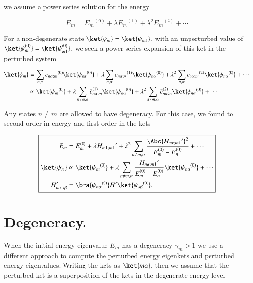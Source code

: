 we assume a power series solution for the energy

\begin{equation}\label{eqn:qmTwoReview:350}
E_m = {E_m}^{(0)} + \lambda {E_m}^{(1)} + \lambda^2 {E_m}^{(2)} + \cdots
\end{equation}

For a non-degenerate state $\ket{\psi_m} = \ket{\psi_{m1}}$, with an unperturbed value of $\ket{\psi_{m}^{(0)}} = \ket{\psi_{m1}^{(0)}}$, we seek a power series expansion of this ket in the perturbed system

\begin{equation}\label{eqn:qmTwoL4:130}
\begin{aligned}
\ket{\psi_m} &= 
\sum_{n,\alpha} {c_{n\alpha;m}}^{(0)} \ket{{\psi_{n\alpha}}^{(0)}} 
+
\lambda
\sum_{n,\alpha} {c_{n\alpha;m}}^{(1)} \ket{{\psi_{n\alpha}}^{(0)}} 
+ 
\lambda^2
\sum_{n,\alpha} {c_{n\alpha;m}}^{(2)} \ket{{\psi_{n\alpha}}^{(0)}} 
+ \cdots \\
&\propto
\ket{{\psi_m}^{(0)}} 
+ 
\lambda
\sum_{n \ne m, \alpha} {\bar{c}_{n\alpha;m}}^{(1)} \ket{{\psi_{n\alpha}}^{(0)}} 
+
\lambda^2
\sum_{n \ne m, \alpha} {\bar{c}_{n\alpha;m}}^{(2)} \ket{{\psi_{n\alpha}}^{(0)}} 
+ \cdots
\end{aligned}
\end{equation}

Any states $n \ne m$ are allowed to have degeneracy.  For this case, we found to second order in energy and first order in the kets

\begin{equation}\label{eqn:qmTwoReview:370}
\boxed{
\begin{aligned}
E_m &= E_m^{(0)} + \lambda {H_{m1;m1}}' + \lambda^2 
\sum_{n \ne m, \alpha} 
\frac{\Abs{{H_{n\alpha;m1}}'}^2 }
{ E_m^{(0)} - E_n^{(0)} } 
+ \cdots
\\
\ket{\psi_m} &\propto \ket{{\psi_m}^{(0)}} + \lambda
\sum_{n \ne m, \alpha} 
\frac{{H_{n\alpha;m1}}'}
{ E_m^{(0)} - E_n^{(0)} } \ket{{\psi_{n\alpha}}^{(0)}}
+ \cdots \\
H_{n\alpha;s\beta}' &=
\bra{{\psi_{n\alpha}}^{(0)}}
H'
\ket{{\psi_{s\beta}}^{(0)}}.
\end{aligned}
}
\end{equation}

\section{Degeneracy.}

When the initial energy eigenvalue $E_m$ has a degeneracy $\gamma_m > 1$ we use a different approach to compute the perturbed energy eigenkets and perturbed energy eigenvalues.  Writing the kets as $\ket{m\alpha}$, then we assume that the perturbed ket is a superposition of the kets in the degenerate energy level

